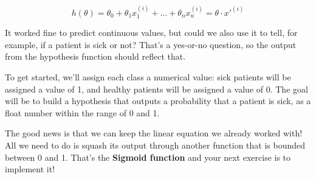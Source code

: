 $$
h(\theta) = \theta_0 + \theta_{1} x_{1}^{(i)} + \dots + \theta_{n} x_{n}^{(i)} = \theta \cdot x'^{(i)}
$$

It worked fine to predict continuous values, but could we also use it to tell, for example, if a patient is sick or not?
That's a yes-or-no question, so the output from the hypothesis function should reflect that.

To get started, we'll assign each class a numerical value: sick patients will be assigned a value of 1, and healthy patients will be assigned a value of 0.
The goal will be to build a hypothesis that outputs a probability that a patient is sick, as a float number within the range of 0 and 1.

The good news is that we can keep the linear equation we already worked with!
All we need to do is squash its output through another function that is bounded between 0 and 1.
That's the \textbf{Sigmoid function} and your next exercise is to implement it!
